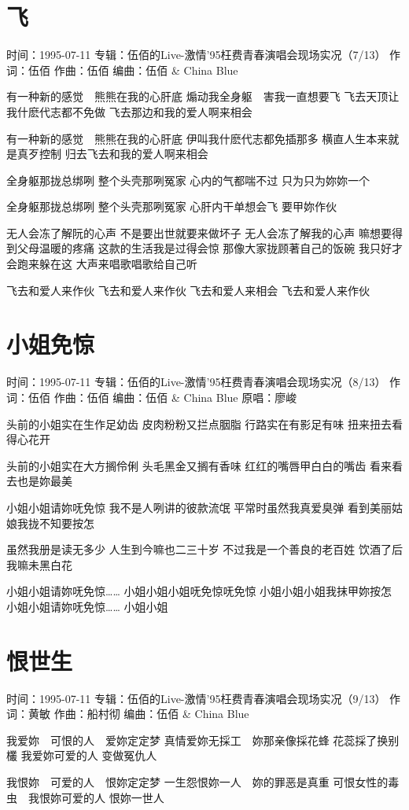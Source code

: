 \documentclass[UTF8,a4paper,oneside,twocolumn,12pt]{ctexbook}
\newcommand{\infopair}[2]{\textbullet #1：#2}
\newcommand{\zc}[1][伍佰]{\infopair{作词}{#1}}
\newcommand{\zq}[1][伍佰]{\infopair{作曲}{#1}}
\newcommand{\bq}[1][伍佰]{\infopair{编曲}{#1}}
\newcommand{\zj}[1]{\infopair{专辑}{#1}}
\newcommand{\yc}[1]{\infopair{原唱}{#1}}
\newcommand{\sj}[1]{\infopair{时间}{#1}}
\newenvironment{info}{\begin{flushleft}\kaishu
	}
	{\end{flushleft}\normalsize\yahei\par}
\newenvironment{lyric}{
	}
{}
\begin{document}
\section{飞}
\begin{info}
	\sj{1995-07-11}
	\zj{伍佰的Live-激情'95枉费青春演唱会现场实况（7/13）}
	\zc
	\zq
	\bq[伍佰 \& China Blue]
\end{info}
\begin{lyric}
	有一种新的感觉　熊熊在我的心肝底
	煽动我全身躯　害我一直想要飞
	飞去天顶让我什麽代志都不免做
	飞去那边和我的爱人啊来相会

	有一种新的感觉　熊熊在我的心肝底
	伊叫我什麽代志都免插那多
	横直人生本来就是真歹控制
	归去飞去和我的爱人啊来相会

	全身躯那拢总绑咧
	整个头壳那咧冤家
	心内的气都喘不过
	只为只为妳妳一个

	全身躯那拢总绑咧
	整个头壳那咧冤家
	心肝内干单想会飞
	要甲妳作伙

	无人会冻了解阮的心声
	不是要出世就要来做坏子
	无人会冻了解我的心声
	嘛想要得到父母温暖的疼痛
	这款的生活我是过得会惊
	那像大家拢顾著自己的饭碗
	我只好才会跑来躲在这
	大声来唱歌唱歌给自己听

	飞去和爱人来作伙
	飞去和爱人来作伙
	飞去和爱人来相会
	飞去和爱人来作伙
\end{lyric}

\section{小姐免惊}
\begin{info}
	\sj{1995-07-11}
	\zj{伍佰的Live-激情'95枉费青春演唱会现场实况（8/13）}
	\zc
	\zq
	\bq[伍佰 \& China Blue]
	\yc{廖峻}
\end{info}
\begin{lyric}
	头前的小姐实在生作足幼齿
	皮肉粉粉又拦点胭脂
	行路实在有影足有味
	扭来扭去看得心花开

	头前的小姐实在大方搁伶俐
	头毛黑金又搁有香味
	红红的嘴唇甲白白的嘴齿
	看来看去也是妳最美

	小姐小姐请妳呒免惊
	我不是人咧讲的彼款流氓
	平常时虽然我真爱臭弹
	看到美丽姑娘我拢不知要按怎

	虽然我册是读无多少
	人生到今嘛也二三十岁
	不过我是一个善良的老百姓
	饮酒了后我嘛未黑白花

	小姐小姐请妳呒免惊……
	小姐小姐小姐呒免惊呒免惊
	小姐小姐小姐我抹甲妳按怎
	小姐小姐请妳呒免惊……
	小姐小姐
\end{lyric}

\section{恨世生}
\begin{info}
	\sj{1995-07-11}
	\zj{伍佰的Live-激情'95枉费青春演唱会现场实况（9/13）}
	\zc[黄敏]
	\zq[船村彻]
	\bq[伍佰 \& China Blue]
\end{info}
\begin{lyric}
	我爱妳　可恨的人　爱妳定定梦
	真情爱妳无採工　妳那亲像採花蜂
	花蕊採了换别欉 我爱妳可爱的人
	变做冤仇人

	我恨妳　可爱的人　恨妳定定梦
	一生怨恨妳一人　妳的罪恶是真重
	可恨女性的毒虫　我恨妳可爱的人
	恨妳一世人
\end{lyric}
\end{document}
